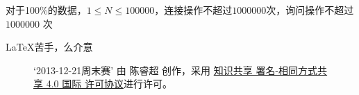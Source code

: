 \documentclass{article}
\begin{document}
\begin{CJK*}{UTF8}{gbsn}
    对于100\%的数据，$1 \leq N \leq 100000$，连接操作不超过$1000000$次，询问操作不超过 $1000000$ 次

    \newpage







    \newpage
    \LaTeX 苦手，么介意
    \begin{SCfigure}[2.0]
        \centering
        
        \caption*{`2013-12-21周末赛' 由 陈睿超 创作，采用 \href{http://creativecommons.org/licenses/by-sa/4.0/}{知识共享 署名-相同方式共享 4.0 国际 许可协议}进行许可。}
    \end{SCfigure}

\end{CJK*}
\end{document}
